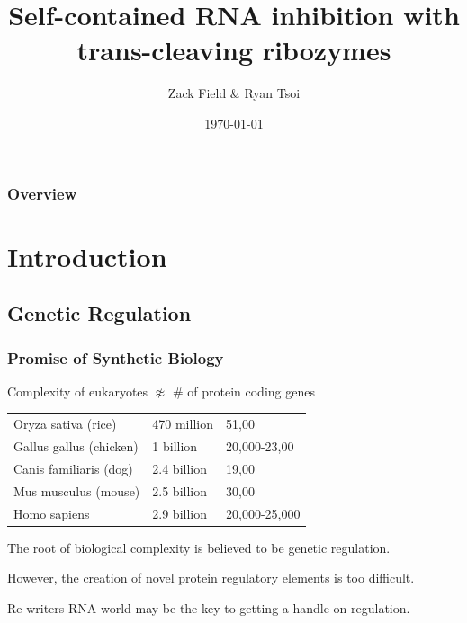 \documentclass{beamer}
\title[RNA circuits]{Self-contained RNA inhibition with trans-cleaving ribozymes} %
\author{Zack Field \& Ryan Tsoi} %
\institute[UC Berkeley] %
{
University of California \\ %
\medskip
\textit{field.zackery@berkeley.edu, ryantsoi@berkeley.edu} %
}
\date{\today} %
\begin{document}
\begin{frame}
\titlepage %
\end{frame}

\begin{frame}
\frametitle{Overview} %
\tableofcontents 
\end{frame}


\section{Introduction} %

\subsection{Genetic Regulation} %

\begin{frame}
\frametitle{Promise of Synthetic Biology}

Complexity of eukaryotes $\not\approx$ \# of protein coding genes

\begin{tabular}{l | l | l}
\hline
Oryza sativa (rice)& 470 million & 51,00\\
Gallus gallus (chicken)& 1 billion& 20,000-23,00\\ 
Canis familiaris (dog)& 2.4 billion& 19,00 \\
Mus musculus (mouse)& 2.5 billion& 30,00 \\
Homo sapiens & 2.9 billion& 20,000-25,000\\
\hline
\end{tabular}

\bigskip
The root of biological complexity is believed to be genetic regulation.

However, the creation of novel protein regulatory elements is too difficult.

Re-writers RNA-world may be the key to getting a handle on regulation.           
\end{frame}
\end{document}
